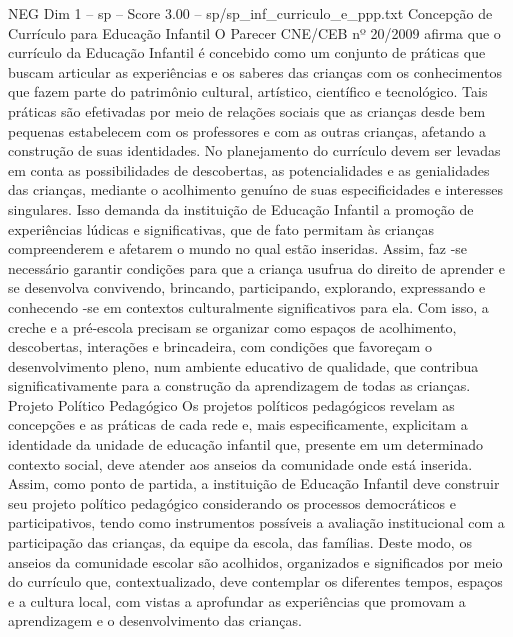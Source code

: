 \begin{textsample}{NEG Dim 1 – sp – Score 3.00 – sp/sp\_inf\_curriculo\_e\_ppp.txt}  \label{ex:f1_neg_171}
Concepção de Currículo para Educação Infantil O Parecer CNE/CEB nº 20/2009 afirma que o currículo da Educação Infantil é concebido como um conjunto de práticas que buscam articular as experiências e os saberes das crianças com os conhecimentos que fazem parte do patrimônio cultural, artístico, científico e tecnológico.
Tais práticas são efetivadas por meio de relações sociais que as crianças desde bem pequenas estabelecem com os professores e com as outras crianças, afetando a construção de suas identidades.
No planejamento do currículo devem ser levadas em conta as possibilidades de descobertas, as potencialidades e as genialidades das crianças, mediante o acolhimento genuíno de suas especificidades e interesses singulares.
Isso demanda da instituição de Educação Infantil a promoção de experiências lúdicas e significativas, que de fato permitam às crianças compreenderem e afetarem o mundo no qual estão inseridas.
Assim, faz -se necessário garantir condições para que a criança usufrua do direito de aprender e se desenvolva convivendo, brincando, participando, explorando, expressando e conhecendo -se em contextos culturalmente significativos para ela.
Com isso, a creche e a pré-escola precisam se organizar como espaços de acolhimento, descobertas, interações e brincadeira, com condições que favoreçam o desenvolvimento pleno, num ambiente educativo de qualidade, que contribua significativamente para a construção da aprendizagem de todas as crianças.
Projeto Político Pedagógico Os projetos políticos pedagógicos revelam as concepções e as práticas de cada rede e, mais especificamente, explicitam a identidade da unidade de educação infantil que, presente em um determinado contexto social, deve atender aos anseios da comunidade onde está inserida.
Assim, como ponto de partida, a instituição de Educação Infantil deve construir seu projeto político pedagógico considerando os processos democráticos e participativos, tendo como instrumentos possíveis a avaliação institucional com a participação das crianças, da equipe da escola, das famílias.
Deste modo, os anseios da comunidade escolar são acolhidos, organizados e significados por meio do currículo que, contextualizado, deve contemplar os diferentes tempos, espaços e a cultura local, com vistas a aprofundar as experiências que promovam a aprendizagem e o desenvolvimento das crianças.

\end{textsample}
